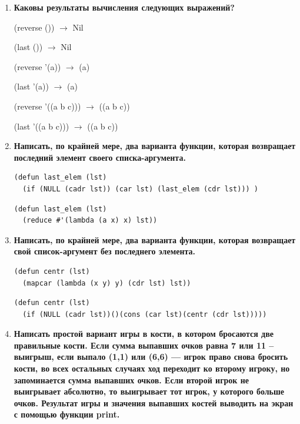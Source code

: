 \documentclass[a4paper,14pt]{extreport} %
\begin{document}
\begin{enumerate}
(cons lst1 lst2) $\to$ ((1 2 3) 4 5)

(list lst1 lst2) $\to$ ((1 2 3) (4 5))

(append lst1 lst2) $\to$ (1 2 3 4 5)

CONS -- позволяет создавать списки (возвращает бинарную ячейку (точечная пара, список), расставляя указатели, обязательно 2 аргумента). 

APPEND -- функция двух аргументов x и y, сцепляющая два списка в один.

LIST -- создает столько списковых ячеек, сколько аргументов (всегда возвращает список).

\item \textbf{Каковы результаты вычисления следующих выражений?}

(reverse ()) $\to$ Nil

(last ()) $\to$ Nil

(reverse '(a)) $\to$ (a)

(last '(a)) $\to$ (a)

(reverse '((a b c))) $\to$ ((a b c))

(last '((a b c))) $\to$ ((a b c))

\item \textbf{Написать, по крайней мере, два варианта функции, которая возвращает последний элемент своего списка-аргумента.}

\begin{lstlisting}
(defun last_elem (lst)
  (if (NULL (cadr lst)) (car lst) (last_elem (cdr lst))) )
\end{lstlisting}

\begin{lstlisting}
(defun last_elem (lst)
  (reduce #'(lambda (a x) x) lst))
\end{lstlisting}

\item \textbf{Написать, по крайней мере, два варианта функции, которая возвращает свой список-аргумент без последнего элемента.}

\begin{lstlisting}
(defun centr (lst)
  (mapcar (lambda (x y) y) (cdr lst) lst))
\end{lstlisting}

\begin{lstlisting}
(defun centr (lst)
  (if (NULL (cadr lst))()(cons (car lst)(centr (cdr lst)))))
\end{lstlisting}

\item \textbf{Написать простой вариант игры в кости, в котором бросаются две правильные кости. Если сумма выпавших очков равна 7 или 11 -- выигрыш, если выпало (1,1) или (6,6) --- игрок право снова бросить кости, во всех остальных случаях ход переходит ко второму игроку, но запоминается сумма выпавших очков. Если второй игрок не выигрывает абсолютно, то выигрывает тот игрок, у которого больше очков. Результат игры и значения выпавших костей выводить на экран с помощью функции print.}


\end{enumerate}
\end{document}
